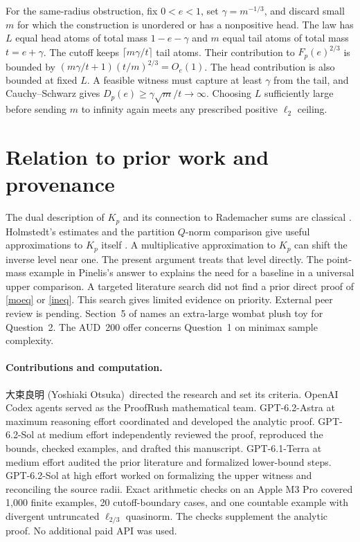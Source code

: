 \documentclass[11pt]{article}
\newcommand{\director}{{\namefont 大束良明} (Yoshiaki Otsuka)}
\newcommand{\F}{F_p}
\newcommand{\D}{D_p}
\begin{document}
For the same-radius obstruction, fix \(0<e<1\), set
\(\gamma=m^{-1/3}\), and discard small \(m\) for which the
construction is unordered or has a nonpositive head. The law
has \(L\) equal head atoms of total mass \(1-e-\gamma\) and \(m\)
equal tail atoms of total mass \(t=e+\gamma\).
The cutoff keeps \(\lceil m\gamma/t\rceil\) tail atoms. Their
contribution to \(\F(e)^{2/3}\) is bounded by
\((m\gamma/t+1)(t/m)^{2/3}=O_e(1)\). The head contribution is also
bounded at fixed \(L\). A feasible witness must capture at least
\(\gamma\) from the tail, and Cauchy--Schwarz gives
\(\D(e)\ge\gamma\sqrt m/t\to\infty\).
Choosing \(L\) sufficiently large before sending \(m\) to infinity
again meets any prescribed positive \(\ell_2\) ceiling.

\section{Relation to prior work and provenance}
The dual description of \(K_p\) and its connection to Rademacher
sums are classical \cite{ms}. Holmstedt's estimates and the
partition \(Q\)-norm comparison give useful approximations to
\(K_p\) itself \cite{holm,bcg}. A multiplicative approximation
to \(K_p\) can shift the inverse level near one. The present
argument treats that level directly. The point-mass example in
Pinelis's answer to \cite{mo} explains the need for a baseline in a
universal upper comparison. A targeted literature search did not
find a prior direct proof of \eqref{moeq} or \eqref{ineq}.
This search gives limited evidence on priority. External peer
review is pending. Section~5 of \cite{colt} names an extra-large
wombat plush toy for Question~2. The AUD~200 offer concerns
Question~1 on minimax sample complexity.

\paragraph{Contributions and computation.}
\director\ directed the research and set its criteria.
OpenAI Codex agents served as the ProofRush mathematical team.
GPT-6.2-Astra at maximum reasoning effort coordinated and developed
the analytic proof. GPT-6.2-Sol at medium effort independently
reviewed the proof, reproduced the bounds, checked examples, and
drafted this manuscript. GPT-6.1-Terra at medium effort audited the
prior literature and formalized lower-bound steps. GPT-6.2-Sol at
high effort worked on formalizing the upper witness and reconciling
the source radii. Exact arithmetic checks on an Apple M3 Pro
covered 1,000 finite examples, 20 cutoff-boundary cases, and one
countable example with divergent untruncated
\(\ell_{2/3}\) quasinorm. The checks supplement the analytic proof.
No additional paid API was used.
\end{document}
